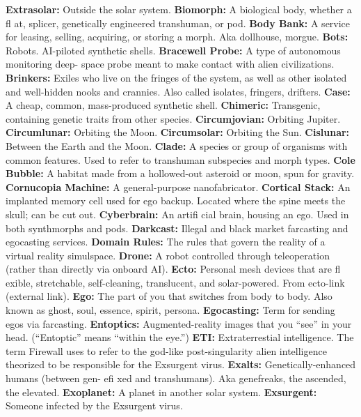 \textbf{ Extrasolar:} Outside the solar system.
\textbf{ Biomorph:} A biological body, whether a ﬂ at, splicer, 
genetically engineered transhuman, or pod.
\textbf{ Body Bank:} A service for leasing, selling, acquiring, or 
storing a morph. Aka dollhouse, morgue.
\textbf{ Bots:} Robots. AI-piloted synthetic shells.
\textbf{ Bracewell Probe:} A type of autonomous monitoring deep-
space probe meant to make contact with alien civilizations.
\textbf{ Brinkers:} Exiles who live on the fringes of the system, 
as well as other isolated and well-hidden nooks and 
crannies. Also called isolates, fringers, drifters.
\textbf{ Case:} A cheap, common, mass-produced synthetic shell.
\textbf{ Chimeric:} Transgenic, containing genetic traits from 
other species.
\textbf{ Circumjovian:} Orbiting Jupiter.
\textbf{ Circumlunar:} Orbiting the Moon.
\textbf{ Circumsolar:} Orbiting the Sun.
\textbf{ Cislunar:} Between the Earth and the Moon.
\textbf{ Clade:} A species or group of organisms with common 
features. Used to refer to transhuman subspecies and 
morph types. 
\textbf{ Cole Bubble:} A habitat made from a hollowed-out 
asteroid or moon, spun for gravity.
\textbf{ Cornucopia Machine:} A general-purpose nanofabricator.
\textbf{ Cortical Stack:} An implanted memory cell used for ego 
backup. Located where the spine meets the skull; can be 
cut out.
\textbf{ Cyberbrain:} An artiﬁ cial brain, housing an ego. Used in 
both synthmorphs and pods.
\textbf{ Darkcast:} Illegal and black market farcasting and 
egocasting services.
\textbf{ Domain Rules:} The rules that govern the reality of a 
virtual reality simulspace.
\textbf{ Drone:} A robot controlled through teleoperation (rather 
than directly via onboard AI).
\textbf{ Ecto:} Personal mesh devices that are ﬂ exible, stretchable, 
self-cleaning, translucent, and solar-powered. From 
ecto-link (external link).
\textbf{ Ego:} The part of you that switches from body to body. 
Also known as ghost, soul, essence, spirit, persona.
\textbf{ Egocasting:} Term for sending egos via farcasting.
\textbf{ Entoptics:} Augmented-reality images that you ``see'' in 
your head. (``Entoptic'' means ``within the eye.'')
\textbf{ ETI:} Extraterrestial intelligence. The term Firewall uses 
to refer to the god-like post-singularity alien intelligence 
theorized to be responsible for the Exsurgent virus.
\textbf{ Exalts:} Genetically-enhanced humans (between gen-
eﬁ xed and transhumans). Aka genefreaks, the ascended, 
the elevated.
\textbf{ Exoplanet:} A planet in another solar system.
\textbf{ Exsurgent:} Someone infected by the Exsurgent virus.
